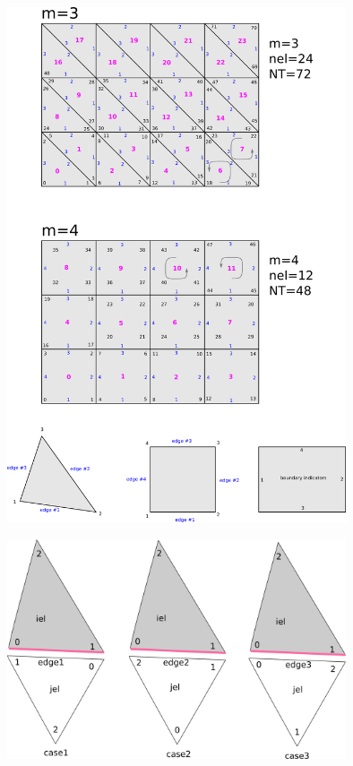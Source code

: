 

\begin{center}
\includegraphics[width=10cm]{python_codes/fieldstone_79/images/grids2D}
\end{center}

\begin{center}
\includegraphics[width=10cm]{python_codes/fieldstone_79/images/drawing}
\end{center}
